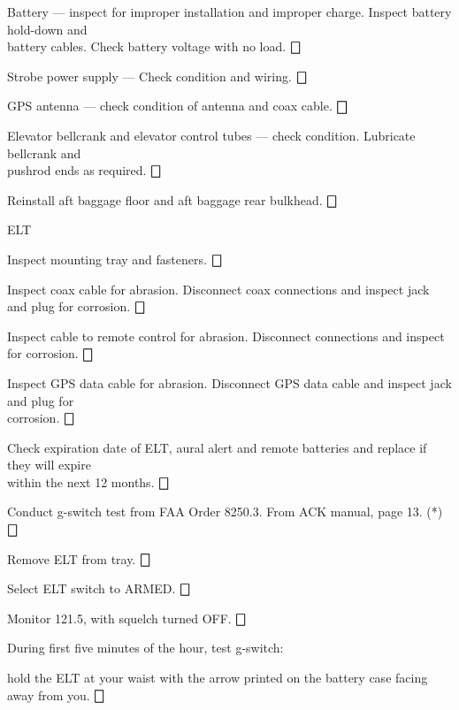\begin{enumerate*}
\begin{enumerate*}
		\item Battery --- inspect for improper installation and improper charge. Inspect battery hold-down and \\battery cables. Check battery voltage with no load. \dotfill $\bigbox$
		\item Strobe power supply --- Check condition and wiring. \dotfill $\bigbox$
		\item GPS antenna --- check condition of antenna and coax cable. \dotfill $\bigbox$
		\item Elevator bellcrank and elevator control tubes --- check condition. Lubricate bellcrank and \\pushrod ends as required. \dotfill $\bigbox$
		\item Reinstall aft baggage floor and aft baggage rear bulkhead. \dotfill $\bigbox$
	\end{enumerate*}
  \item{ELT} 
  \begin{enumerate*}
  	\item Inspect mounting tray and fasteners. \dotfill $\bigbox$
  	\item Inspect coax cable for abrasion. Disconnect coax connections and inspect jack and plug for corrosion. \dotfill $\bigbox$
  	\item Inspect cable to remote control for abrasion. Disconnect connections and inspect for corrosion. \dotfill $\bigbox$
  	\item Inspect GPS data cable for abrasion. Disconnect GPS data cable and inspect jack and plug for \\corrosion. \dotfill $\bigbox$
  	\item Check expiration date of ELT, aural alert and remote batteries and replace if they will expire \\within the next 12 months. \dotfill $\bigbox$
  	\item Conduct g-switch test from FAA Order 8250.3. From ACK manual, page 13. (*) \dotfill $\bigbox$
  	\begin{enumerate*}
  		\item Remove ELT from tray. \dotfill $\bigbox$
  		\item Select ELT switch to ARMED. \dotfill $\bigbox$
  		\item Monitor 121.5, with squelch turned OFF. \dotfill $\bigbox$
  		\item During first five minutes of the hour, test g-switch: 
  		\begin{enumerate*}
  		  \item hold the ELT at your waist with the arrow printed on the battery case facing away from you. \dotfill $\bigbox$

\end{enumerate*}
\end{enumerate*}
\end{enumerate*}
\end{enumerate*}
